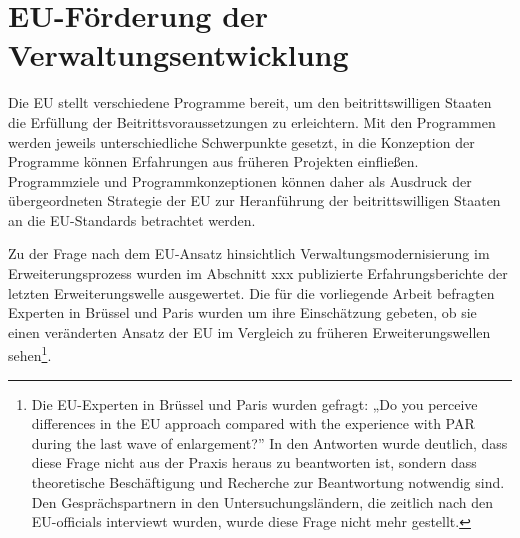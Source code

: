 \section{EU-Förderung der Verwaltungsentwicklung }
Die EU stellt verschiedene Programme bereit, um den beitrittswilligen Staaten die Erfüllung der Beitrittsvoraussetzungen zu erleichtern. Mit den Programmen werden jeweils unterschiedliche Schwerpunkte gesetzt, in die Konzeption der Programme können Erfahrungen aus früheren Projekten einfließen. Programmziele und Programmkonzeptionen können daher als Ausdruck der übergeordneten Strategie der EU zur Heranführung der beitrittswilligen Staaten an die EU-Standards betrachtet werden.\par
Zu der Frage nach dem EU-Ansatz hinsichtlich Verwaltungsmodernisierung im Erweiterungsprozess wurden im Abschnitt xxx publizierte Erfahrungsberichte der letzten Erweiterungswelle ausgewertet. Die für die vorliegende Arbeit befragten Experten in Brüssel und Paris wurden um ihre Einschätzung gebeten, ob sie einen veränderten Ansatz der EU im Vergleich zu früheren Erweiterungswellen sehen\footnote{Die EU-Experten in Brüssel und Paris wurden gefragt: „Do you perceive differences in the EU approach compared with the experience with PAR during the last wave of enlargement?” In den Antworten wurde deutlich, dass diese Frage nicht aus der Praxis heraus zu beantworten ist, sondern dass theoretische Beschäftigung und Recherche zur Beantwortung notwendig sind. Den Gesprächspartnern in den Untersuchungsländern, die zeitlich nach den EU-officials interviewt wurden, wurde diese Frage nicht mehr gestellt.}.

